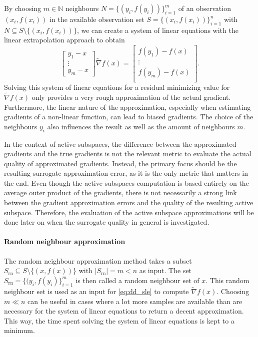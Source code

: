 \documentclass[
  a4paper,  %
  twoside,  %
  bibliography=totoc,
  headsepline,
  cleardoublepage=empty,
  parskip=half,
  draft=false
]{scrbook}
\begin{document}
By choosing $m \in \mathds{N}$ neighbours $N = \{(y_i, f(y_i))\}_{i=1}^m$ of an observation $(x_i, f(x_i))$ in the available observation set $S = \{(x_i, f(x_i))\}_{i=1}^n$ with $N \subseteq S \setminus \{(x_i, f(x_i))\}$, we can create a system of linear equations with the linear extrapolation approach to obtain
\begin{equation}
\begin{bmatrix}
    y_1 - x\\
    \vdots \\
    y_m - x
  \end{bmatrix}  \widetilde{\nabla} f(x) =\begin{bmatrix}
    f(y_1) - f(x) \\ \vdots \\  f(y_m) - f(x)
    \\
  \end{bmatrix}.
  \label{eq:dd_sle}
\end{equation}
%
Solving this system of linear equations for a residual minimizing value for $\widetilde{\nabla} f(x)$ only provides a very rough approximation of the actual gradient.
Furthermore, the linear nature of the approximation, especially when estimating gradients of a non-linear function, can lead to biased gradients.
The choice of the neighbours $y_i$ also influences the result as well as the amount of neighbours $m$.

In the context of active subspaces, the difference between the approximated gradients and the true gradients is not the relevant metric to evaluate the actual quality of approximated gradients.
Instead, the primary focus should be the resulting surrogate approximation error, as it is the only metric that matters in the end.
Even though the active subspaces computation is based entirely on the average outer product of the gradients, there is not necessarily a strong link between the gradient approximation errors and the quality of the resulting active subspace.
Therefore, the evaluation of the active subspace approximations will be done later on when the surrogate quality in general is investigated.

\paragraph{Random neighbour approximation}
The random neighbour approximation method takes a subset $S_{\text{rn}} \subseteq S \setminus \{(x, f(x))\}$ with $|S_{\text{rn}}|=m < n$ as input.
The set $S_{\text{rn}}=\{(y_i, f(y_i)\}_{i=1}^m$ is then called a random neighbour set of $x$.
This random neighbour set is used as an input for \cref{eq:dd_sle} to compute $\widetilde{\nabla} f(x)$.
Choosing $m \ll n$ can be useful in cases where a lot more samples are available than are necessary for the system of linear equations to return a decent approximation.
This way, the time spent solving the system of linear equations is kept to a minimum.
\end{document}
